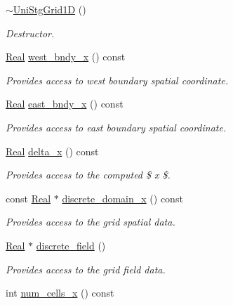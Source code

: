 \begin{DoxyCompactItemize}
\hyperlink{classmtk_1_1UniStgGrid1D_a609a8793d238d241f9b11c3afed8d24d}{$\sim$\+Uni\+Stg\+Grid1\+D} ()
\begin{DoxyCompactList}\small\item\em Destructor. \end{DoxyCompactList}\item 
\hyperlink{group__c01-roots_gac080bbbf5cbb5502c9f00405f894857d}{Real} \hyperlink{classmtk_1_1UniStgGrid1D_afab51be12598704d2dd6d760f826669b}{west\+\_\+bndy\+\_\+x} () const 
\begin{DoxyCompactList}\small\item\em Provides access to west boundary spatial coordinate. \end{DoxyCompactList}\item 
\hyperlink{group__c01-roots_gac080bbbf5cbb5502c9f00405f894857d}{Real} \hyperlink{classmtk_1_1UniStgGrid1D_a3b413aeadcc3d3263f6817f3af1dee95}{east\+\_\+bndy\+\_\+x} () const 
\begin{DoxyCompactList}\small\item\em Provides access to east boundary spatial coordinate. \end{DoxyCompactList}\item 
\hyperlink{group__c01-roots_gac080bbbf5cbb5502c9f00405f894857d}{Real} \hyperlink{classmtk_1_1UniStgGrid1D_a6e7173b01241632cf509496d66b9f74c}{delta\+\_\+x} () const 
\begin{DoxyCompactList}\small\item\em Provides access to the computed \$  x \$. \end{DoxyCompactList}\item 
const \hyperlink{group__c01-roots_gac080bbbf5cbb5502c9f00405f894857d}{Real} $\ast$ \hyperlink{classmtk_1_1UniStgGrid1D_aa1999580cb98c19950e951510871cc90}{discrete\+\_\+domain\+\_\+x} () const 
\begin{DoxyCompactList}\small\item\em Provides access to the grid spatial data. \end{DoxyCompactList}\item 
\hyperlink{group__c01-roots_gac080bbbf5cbb5502c9f00405f894857d}{Real} $\ast$ \hyperlink{classmtk_1_1UniStgGrid1D_ab9c3f9ee2ac76a351b01e4abfede4d19}{discrete\+\_\+field} ()
\begin{DoxyCompactList}\small\item\em Provides access to the grid field data. \end{DoxyCompactList}\item 
int \hyperlink{classmtk_1_1UniStgGrid1D_af1b3729d8afa07be5b2775ed68015b80}{num\+\_\+cells\+\_\+x} () const 

\end{DoxyCompactItemize}
